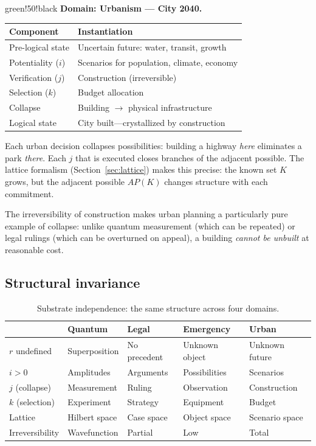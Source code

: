 \documentclass[11pt,a4paper]{article}
\begin{document}
\begin{domainbox}{green!50!black}
\textbf{Domain: Urbanism --- City 2040.}

\begin{tabularx}{\textwidth}{l Y}
\toprule
\textbf{Component} & \textbf{Instantiation} \\
\midrule
Pre-logical state & Uncertain future: water, transit, growth \\
Potentiality ($i$) & Scenarios for population, climate, economy \\
Verification ($j$) & Construction (irreversible) \\
Selection ($k$) & Budget allocation \\
Collapse & Building $\to$ physical infrastructure \\
Logical state & City built---crystallized by construction \\
\bottomrule
\end{tabularx}

Each urban decision collapses possibilities: building a highway
\emph{here} eliminates a park \emph{there}. Each $j$ that is executed
closes branches of the adjacent possible. The lattice formalism
(Section~\ref{sec:lattice}) makes this precise: the known set
$K$ grows, but the adjacent possible $AP(K)$ changes structure with
each commitment.

The irreversibility of construction makes urban planning a
particularly pure example of collapse: unlike quantum measurement
(which can be repeated) or legal rulings (which can be overturned on
appeal), a building \emph{cannot be unbuilt} at reasonable cost.
\end{domainbox}

\subsection{Structural invariance}

\begin{table}[H]
\centering
\caption{Substrate independence: the same structure across four domains.}
\label{tab:substrate}
\begin{tabularx}{\textwidth}{l Y Y Y Y}
\toprule
& \textbf{Quantum} & \textbf{Legal} & \textbf{Emergency} & \textbf{Urban} \\
\midrule
$r$ undefined & Superposition & No precedent & Unknown object & Unknown future \\
$i > 0$ & Amplitudes & Arguments & Possibilities & Scenarios \\
$j$ (collapse) & Measurement & Ruling & Observation & Construction \\
$k$ (selection) & Experiment & Strategy & Equipment & Budget \\
Lattice & Hilbert space & Case space & Object space & Scenario space \\
Irreversibility & Wavefunction & Partial & Low & Total \\
\bottomrule
\end{tabularx}
\end{table}
\end{document}
